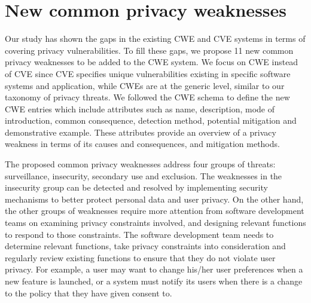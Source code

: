\section{New common privacy weaknesses} \label{sec:cwe-proposal}

Our study has shown the gaps in the existing CWE and CVE systems in terms of covering privacy vulnerabilities. To fill these gaps, we propose 11 new common privacy weaknesses to be added to the CWE system. We focus on CWE instead of CVE since CVE specifies unique vulnerabilities existing in specific software systems and application, while CWEs are at the generic level, similar to our taxonomy of privacy threats. We followed the CWE schema \cite{CWEschema2021} to define the new CWE entries which include attributes such as name, description, mode of introduction, common consequence, detection method, potential mitigation and demonstrative example. These attributes provide an overview of a privacy weakness in terms of its causes and consequences, and mitigation methods.


The proposed common privacy weaknesses address four groups of threats: surveillance, insecurity, secondary use and exclusion. The weaknesses in the insecurity group can be detected and resolved by implementing security mechanisms to better protect personal data and user privacy. On the other hand, the other groups of weaknesses require more attention from software development teams on examining privacy constraints involved, and designing relevant functions to respond to those constraints. The software development team needs to determine relevant functions, take privacy constraints into consideration and regularly review existing functions to ensure that they do not violate user privacy. For example, a user may want to change his/her user preferences when a new feature is launched, or a system must notify its users when there is a change to the policy that they have given consent to.

